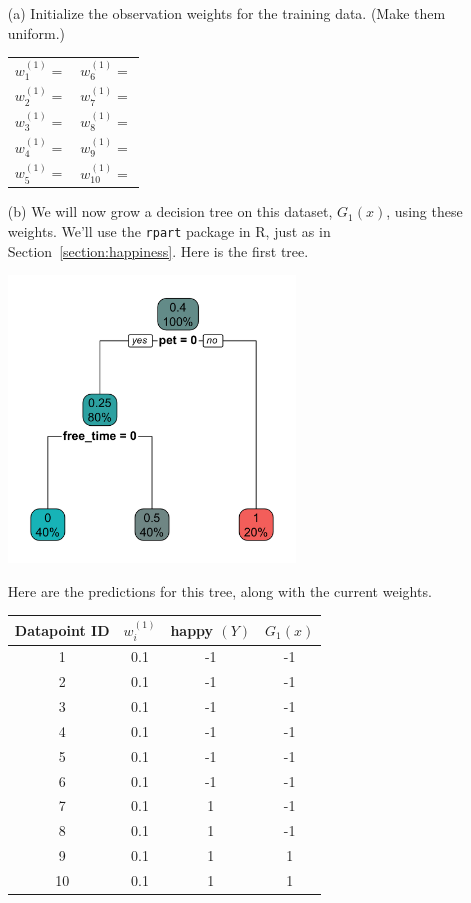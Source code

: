 \begin{enumerate}
\item[(a)] Initialize the observation weights for the training data. (Make them uniform.)
\begin{center}
\begin{tabular}{p{}p{}}
$w_1^{(1)} = $ \hfill & $w_6^{(1)} = $ \hfill \\
$w_2^{(1)} = $ \hfill & $w_7^{(1)} = $ \hfill \\
$w_3^{(1)} = $ \hfill & $w_8^{(1)} = $ \hfill \\
$w_4^{(1)} = $ \hfill & $w_9^{(1)} = $ \hfill \\
$w_5^{(1)} = $ \hfill & $w_{10}^{(1)} = $ \hfill \\
\end{tabular}
\end{center}

\item[(b)] We will now grow a decision tree on this dataset, $G_1(x)$, using these weights. We'll use the \texttt{rpart} package in R, just as in Section~\ref{section:happiness}. Here is the first tree.

\begin{center}
\includegraphics[width=0.6\textwidth]{img/happiness-boosting-tree-1.png}
\end{center}

\noindent Here are the predictions for this tree, along with the current weights.

{\small
\begin{center}
\begin{tabular}{cccc}
\toprule
Datapoint ID & $w_i^{(1)}$ & happy $(Y)$ & $G_1(x)$ \\
\midrule
1 & 0.1 & -1 & -1 \\
2 & 0.1 & -1 & -1 \\
3 & 0.1 & -1 & -1 \\
4 & 0.1 & -1 & -1 \\
5 & 0.1 & -1 & -1 \\
6 & 0.1 & -1 & -1 \\
\midrule
7 & 0.1 & 1 & -1 \\
8 & 0.1 & 1 & -1 \\
9 & 0.1 & 1 & 1 \\
10 & 0.1 & 1 & 1 \\
\bottomrule
\end{tabular}
\end{center}
}


\end{enumerate}
